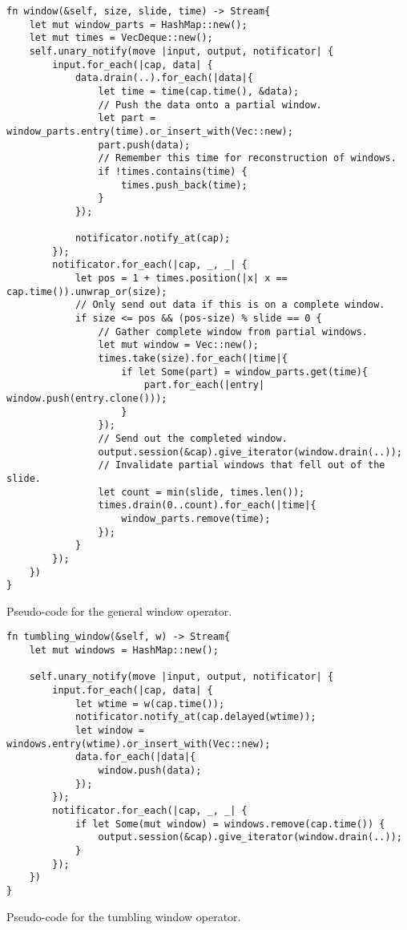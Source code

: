 \begin{listing}[H]
\begin{verbatim}
fn window(&self, size, slide, time) -> Stream{
    let mut window_parts = HashMap::new();
    let mut times = VecDeque::new();
    self.unary_notify(move |input, output, notificator| {
        input.for_each(|cap, data| {
            data.drain(..).for_each(|data|{
                let time = time(cap.time(), &data);
                // Push the data onto a partial window.
                let part = window_parts.entry(time).or_insert_with(Vec::new);
                part.push(data);
                // Remember this time for reconstruction of windows.
                if !times.contains(time) {
                    times.push_back(time);
                }
            });
            
            notificator.notify_at(cap);
        });
        notificator.for_each(|cap, _, _| {
            let pos = 1 + times.position(|x| x == cap.time()).unwrap_or(size);
            // Only send out data if this is on a complete window.
            if size <= pos && (pos-size) % slide == 0 {
                // Gather complete window from partial windows.
                let mut window = Vec::new();
                times.take(size).for_each(|time|{
                    if let Some(part) = window_parts.get(time){
                        part.for_each(|entry| window.push(entry.clone()));
                    }
                });
                // Send out the completed window.
                output.session(&cap).give_iterator(window.drain(..));
                // Invalidate partial windows that fell out of the slide.
                let count = min(slide, times.len());
                times.drain(0..count).for_each(|time|{
                    window_parts.remove(time);
                });
            }
        });
    })
}
\end{verbatim}
  \caption{Pseudo-code for the general window operator.}
  \label{lst:epoch-window}
\end{listing}

\begin{listing}[H]
\begin{verbatim}
fn tumbling_window(&self, w) -> Stream{
    let mut windows = HashMap::new();
    
    self.unary_notify(move |input, output, notificator| {
        input.for_each(|cap, data| {
            let wtime = w(cap.time());
            notificator.notify_at(cap.delayed(wtime));
            let window = windows.entry(wtime).or_insert_with(Vec::new);
            data.for_each(|data|{
                window.push(data);
            });
        });
        notificator.for_each(|cap, _, _| {
            if let Some(mut window) = windows.remove(cap.time()) {
                output.session(&cap).give_iterator(window.drain(..));
            }
        });
    })
}
\end{verbatim}
  \caption{Pseudo-code for the tumbling window operator.}
  \label{lst:tumbling-window}
\end{listing}

